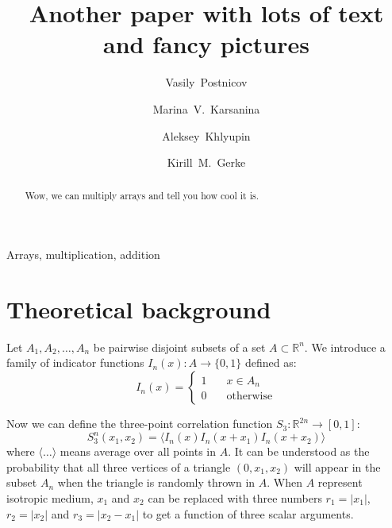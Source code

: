 \documentclass[1p]{elsarticle}
\begin{document}
\author[Smith]{Vasily~Postnicov}
\author[Smith]{Marina~V.~Karsanina}
\author[Smith,MIT]{Aleksey~Khlyupin}
\author[Smith]{Kirill~M.~Gerke}

\address[Smith]{Schmidt Institute of Physics of the Earth of Russian Academy of
  Sciences, Moscow, 107031, Russia}
\address[MIT]{Moscow Institute of Physics and Technology,
  Dolgoprudny, 141701, Russia}

\title{Another paper with lots of text and fancy pictures}

\begin{abstract}
  Wow, we can multiply arrays and tell you how cool it is.
\end{abstract}

\begin{keyword}
  Arrays, multiplication, addition
\end{keyword}

\maketitle

\section{Theoretical background}
Let $A_1, A_2, \dots, A_n$ be pairwise disjoint subsets of a set
$A \subset \mathbb{R}^n$. We introduce a family of indicator functions
$I_n(x) : A \rightarrow \{0,1\}$ defined as:
\begin{equation}
  I_n(x) = \left\{
  \begin{array}{ll}
    1 & \quad x \in A_n \\
    0 & \quad \text{otherwise}
  \end{array}
  \right.
\end{equation}

Now we can define the three-point correlation function
$S_3: \mathbb{R}^{2n} \rightarrow [0, 1]$:
\begin{equation}
  S_3^n(x_1, x_2) = \langle I_n(x) I_n(x + x_1) I_n(x + x_2) \rangle
\end{equation}
where $\langle \dots \rangle$ means average over all points in $A$. It can be
understood as the probability that all three vertices of a triangle
$(0, x_1, x_2)$ will appear in the subset $A_n$ when the triangle is randomly
thrown in $A$. When $A$ represent isotropic medium, $x_1$ and $x_2$ can be
replaced with three numbers $r_1 = |x_1|$, $r_2 = |x_2|$ and $r_3 = |x_2 - x_1|$
to get a function of three scalar arguments.
\end{document}
